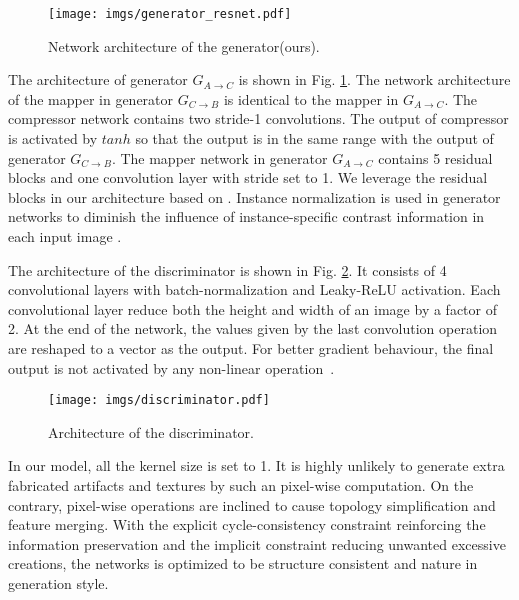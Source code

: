 \documentclass[10pt,conference,a4paper]{IEEEtran}
\begin{document}
\begin{figure}[!t]
\centering
\texttt{[image: imgs/generator\_resnet.pdf]}
\caption{Network architecture of the generator(ours).}
\label{fig:gen_ours}
\end{figure}

The architecture of generator $G_{A\rightarrow C}$ is shown in Fig. \ref{fig:gen_ours}. The network architecture of the mapper in generator $G_{C\rightarrow B}$ is identical to the mapper in $G_{A\rightarrow C}$.
The compressor network contains two stride-1 convolutions. The output of compressor is activated by $tanh$ so that the output is in the same range with the output of generator $G_{C\rightarrow B}$. The mapper network in generator $G_{A\rightarrow C}$ contains 5 residual blocks and one convolution layer with stride set to 1. We leverage the residual blocks in our architecture based on \cite{resnet2015}. Instance normalization is used in generator networks to diminish the influence of instance-specific contrast information in each input image \cite{2016instancenorm}.

The architecture of the discriminator is shown in Fig. \ref{fig:disc}. It consists of 4 convolutional layers with batch-normalization and Leaky-ReLU activation. Each convolutional layer reduce both the height and width of an image by a factor of 2. At the end of the network, the values given by the last convolution operation are reshaped to a vector as the output. For better gradient behaviour, the final output is not activated by any non-linear operation~\cite{wgan}.
\begin{figure}[!t]
\centering
\texttt{[image: imgs/discriminator.pdf]}
\caption{Architecture of the discriminator.}
\label{fig:disc}
\end{figure}



In our model, all the kernel size is set to 1. It is highly unlikely to generate extra fabricated artifacts and textures by such an pixel-wise computation.
On the contrary, pixel-wise operations are inclined to cause topology simplification and feature merging.
With the explicit cycle-consistency constraint reinforcing the information preservation and the implicit constraint reducing unwanted excessive creations, the networks is optimized to be structure consistent and nature in generation style.
\end{document}
